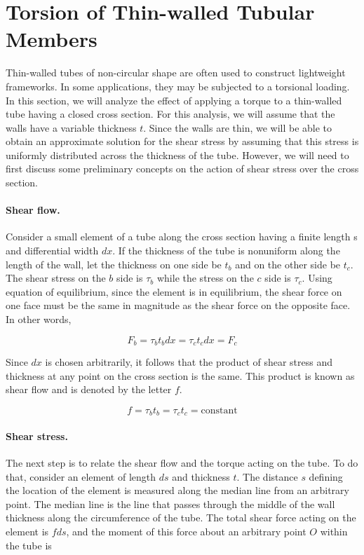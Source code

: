 \documentclass[
10pt,
a4paper,
openany,
svgnames,
]{kaobook} %
\begin{document}
\section{Torsion of Thin-walled Tubular Members}

Thin-walled tubes of non-circular shape are often used to construct lightweight frameworks. In some applications, they may be subjected to a torsional loading. In this section, we will analyze the effect of applying a torque to a thin-walled tube having a closed cross section. For this analysis, we will assume that the walls have a variable thickness $t$. Since the walls are thin, we will be able to obtain an approximate solution for the shear stress by assuming that this stress is uniformly distributed across the thickness of the tube. However, we will need to first discuss some preliminary concepts on the action of shear stress over the cross section.

\paragraph{Shear flow.} Consider a small element of a tube along the cross section having a finite length s and differential width $dx$. If the thickness of the tube is nonuniform along the length of the wall, let the thickness on one side be $t_b$ and on the other side be $t_c$. The shear stress on the $b$ side is $\tau_b$ while the stress on the $c$ side is $\tau_c$. Using equation of equilibrium, since the element is in equilibrium, the shear force on one face must be the same in magnitude as the shear force on the opposite face. In other words,

\[F_b = \tau_bt_bdx = \tau_ct_cdx = F_c\]

Since $dx$ is chosen arbitrarily, it follows that the product of shear stress and thickness at any point on the cross section is the same. This product is known as shear flow and is denoted by the letter $f$.

\begin{equation}
  f = \tau_bt_b = \tau_ct_c = \text{constant}
\end{equation}

\paragraph{Shear stress.} The next step is to relate the shear flow and the torque acting on the tube. To do that, consider an element of length $ds$ and thickness $t$. The distance $s$ defining the location of the element is measured along the median line from an arbitrary point. The median line is the line that passes through the middle of the wall thickness along the circumference of the tube.
The total shear force acting on the element is $fds$, and the moment of this force about an arbitrary point $O$ within the tube is
\end{document}
